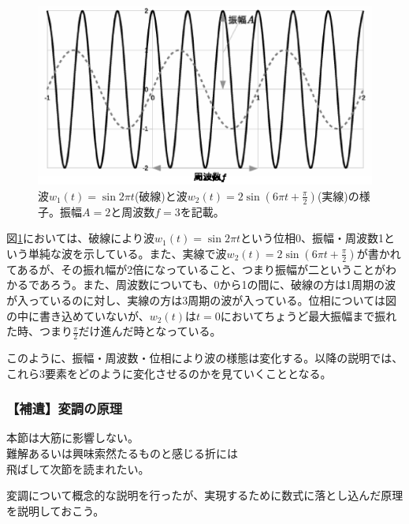 \begin{figure}[htbp]
\centering
\includegraphics[width=0.9\linewidth,keepaspectratio]{fig/fig6_1.eps}
\caption{波$w_1(t)=\sin 2\pi t$(破線)と波$w_2(t)=2\sin (6\pi t+\frac{\pi}{2})$(実線)の様子。振幅$A=2$と周波数$f=3$を記載。}
\label{fig6_1}
\end{figure}

図\ref{fig6_1}においては、破線により波$w_1(t)=\sin 2\pi t$という位相0、振幅・周波数1という単純な波を示している。また、実線で波$w_2(t)=2\sin (6\pi t+\frac{\pi}{2})$が書かれてあるが、その振れ幅が2倍になっていること、つまり振幅が二ということがわかるであろう。また、周波数についても、0から1の間に、破線の方は1周期の波が入っているのに対し、実線の方は3周期の波が入っている。位相については図の中に書き込めていないが、$w_2(t)$は$t=0$においてちょうど最大振幅まで振れた時、つまり$\frac{\pi}{2}$だけ進んだ時となっている。

このように、振幅・周波数・位相により波の様態は変化する。以降の説明では、これら3要素をどのように変化させるのかを見ていくこととなる。

\subsubsection{【補遺】変調の原理}
\begin{center}
\begin{minipage}[]{0.75\linewidth}
\begin{screen}
\begin{center}
本節は大筋に影響しない。\\
難解あるいは興味索然たるものと感じる折には\\
飛ばして次節を読まれたい。
\end{center}
\end{screen}
\end{minipage}
\end{center}

変調について概念的な説明を行ったが、実現するために数式に落とし込んだ原理を説明しておこう。


